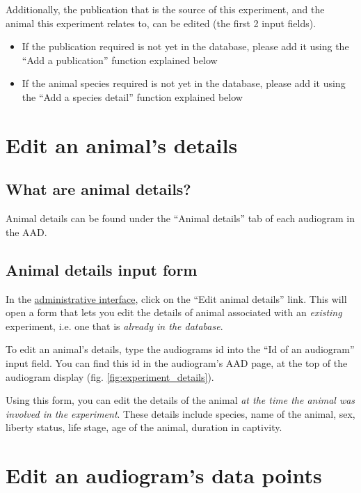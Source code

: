\documentclass{article}
\begin{document}
Additionally, the publication that is the source of this experiment, and the animal this experiment relates to, can be edited (the first 2 input fields).
\begin{itemize}
\item{If the publication required is not yet in the database, please add it using the ``Add a publication'' function explained below}
\item{If the animal species required is not yet in the database, please add it using the ``Add a species detail'' function explained below}
\end{itemize}


\section{Edit an animal's details}
\subsection{What are animal details?}
Animal details can be found under the ``Animal details'' tab of each audiogram in the AAD.

\subsection{Animal details input form}
In the \href{https://animalaudiograms.museumfuernaturkunde.berlin/admin/v1/start}{administrative interface}, click on the ``Edit animal details'' link. This will open a form that lets you edit the details of animal associated with an \emph{existing} experiment, i.e. one that is \emph{already in the database}.

To edit an animal's details, type the audiograms id into the ``Id of an audiogram'' input field. You can find this id in the audiogram's AAD page, at the top of the audiogram display (fig. \ref{fig:experiment_details}).

Using this form, you can edit the details of the animal \emph{at the time the animal was involved in the experiment}. These details include species, name of the animal, sex, liberty status, life stage, age of the animal, duration in captivity. 

\section{Edit an audiogram's data points}
\end{document}
